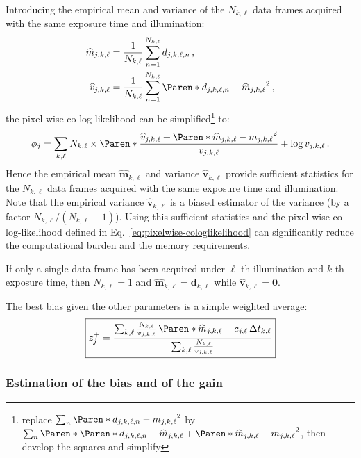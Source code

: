 \documentclass[a4paper,11pt,twoside]{scrartcl}
\newcommand*{\estim}[1]{\widehat{#1}}
\newcommand*{\V}[1]{\boldsymbol{#1}}   %
\theoremstyle{plain} %
\theoremstyle{definition}
\theoremstyle{remark}
\begin{document}
Introducing the empirical mean and variance of the $N_{k,\ell}$ data frames
acquired with the same exposure time and illumination:
\begin{align}
  \label{eq:sample-mean}
  \estim{m}_{j,k,\ell}
  &= \frac{1}{N_{k,\ell}} \sum_{n=1}^{N_{k,\ell}} d_{j,k,\ell,n} \, , \\
  \label{eq:sample-variance}
  \estim{v}_{j,k,\ell}
  &= \frac{1}{N_{k,\ell}}\sum_{n=1}^{N_{k,\ell}}
    \Paren*{d_{j,k,\ell,n} - \estim{m}_{j,k,\ell}}^2 \, ,
\end{align}
the pixel-wise co-log-likelihood can be simplified\footnote{replace
$\sum_n\Paren*{d_{j,k,\ell,n} - m_{j,k,\ell}}^2$ by
$\sum_n\Paren*{\Paren*{d_{j,k,\ell,n} - \estim{m}_{j,k,\ell}} +
\Paren*{\estim{m}_{j,k,\ell} - m_{j,k,\ell}}}^2$, then develop the squares and
simplify} to:
\begin{align}
  \label{eq:pixelwise-cologlikelihood}
  \phi_j =
  \sum_{k,\ell} N_{k,\ell}\times\Paren*{
    \frac{
      \estim{v}_{j,k,\ell}
      + \Paren*{\estim{m}_{j,k,\ell} - m_{j,k,\ell}}^2
    }{
      v_{j,k,\ell}
    }
    + \log v_{j,k,\ell}
  } \, .
\end{align}
Hence the empirical mean $\estim{\V m}_{k,\ell}$ and variance  $\estim{\V
v}_{k,\ell}$ provide sufficient statistics for the $N_{k,\ell}$ data frames
acquired with the same exposure time and illumination.  Note that the empirical
variance  $\estim{\V v}_{k,\ell}$ is a biased estimator of the variance (by a
factor $N_{k,\ell}/(N_{k,\ell} - 1)$).  Using this sufficient statistics and the
pixel-wise co-log-likelihood defined in Eq.~\eqref{eq:pixelwise-cologlikelihood}
can significantly reduce the computational burden and the memory requirements.

If only a single data frame has been acquired under $\ell$-th illumination and
$k$-th exposure time, then $N_{k,\ell} = 1$ and $\estim{\V m}_{k,\ell} = \V
d_{k,\ell}$ while $\estim{\V v}_{k,\ell} = \V0$.

The best bias given the other parameters is a simple weighted average:
\begin{equation}
  \boxed{
    z^+_j = \frac{
      \sum_{k,\ell}\frac{N_{k,\ell}}{v_{j,k,\ell}}\,\Paren*{
        \estim{m}_{j,k,\ell} - c_{j,\ell}\,\Delta t_{k,\ell}
      }
    }{
      \sum_{k,\ell}\frac{N_{k,\ell}}{v_{j,k,\ell}}
    }
  }
  \label{eq:best-bias}
\end{equation}



\subsubsection{Estimation of the bias and of the gain}
\end{document}
